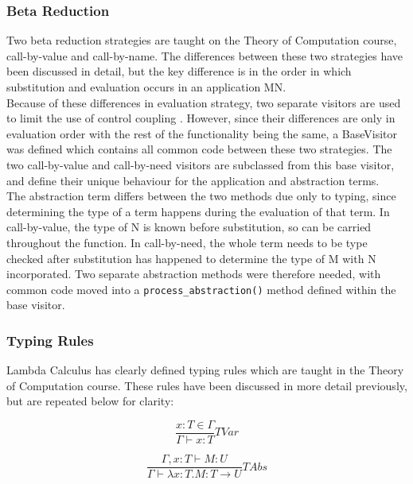 \documentclass[a4paper,12pt]{report}
\begin{document}
\subsubsection{Beta Reduction}

Two beta reduction strategies are taught on the Theory of Computation course, call-by-value and call-by-name. The differences between these two strategies have been discussed in detail, but the key difference is in the order in which substitution and evaluation occurs in an application MN.\\

Because of these differences in evaluation strategy, two separate visitors are used to limit the use of control coupling \cite{Lethbridge2004}. However, since their differences are only in evaluation order with the rest of the functionality being the same, a BaseVisitor was defined which contains all common code between these two strategies. The two call-by-value and call-by-need visitors are subclassed from this base visitor, and define their unique behaviour for the application and abstraction terms.\\

The abstraction term differs between the two methods due only to typing, since determining the type of a term happens during the evaluation of that term. In call-by-value, the type of N is known before substitution, so can be carried throughout the function. In call-by-need, the whole term needs to be type checked after substitution has happened to determine the type of M with N incorporated. Two separate abstraction methods were therefore needed, with common code moved into a \texttt{process_abstraction()} method defined within the base visitor.

\subsubsection{Typing Rules}

Lambda Calculus has clearly defined typing rules which are taught in the Theory of Computation course. These rules have been discussed in more detail previously, but are repeated below for clarity:

\begin{equation*}
\frac{x:T\in \Gamma}{\Gamma \vdash x:T}TVar
\end{equation*}

\begin{equation*}
\frac{\Gamma ,x:T\vdash M:U}{\Gamma \vdash \lambda x:T.M:T \to U}TAbs
\end{equation*}
\end{document}
